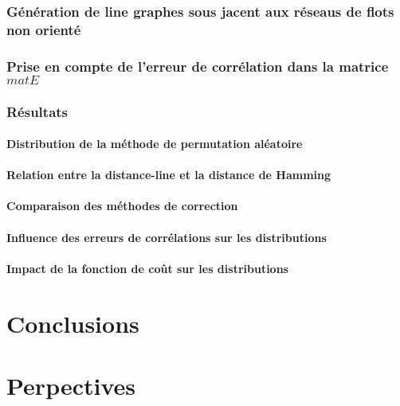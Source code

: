 \documentclass[onecolumn, 12pt]{book}
\begin{document}
		\subsection{G\'en\'eration de line graphes sous jacent aux r\'eseaus de flots non orient\'e}
		\subsection{Prise en compte de l'erreur de corr\'elation dans la matrice $matE$}
		\subsection{R\'esultats}
			\subsubsection{Distribution de la m\'ethode de permutation al\'eatoire}
			\subsubsection{Relation entre la distance-line et la distance de Hamming}
			\subsubsection{Comparaison des m\'ethodes de correction}
			\subsubsection{Influence des erreurs de corr\'elations sur les distributions}
			\subsubsection{Impact de la fonction de co\^ut sur les distributions}
	
\chapter{Conclusions}
\chapter{Perpectives}
\tableofcontents
 
\end{document}
